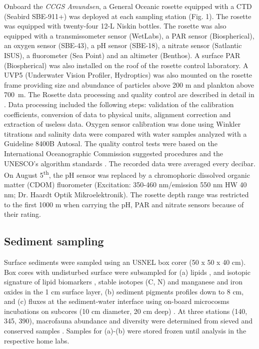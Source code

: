 \documentclass[essd, manuscript]{copernicus}
\begin{document}
Onboard the \textit{CCGS Amundsen}, a General Oceanic rosette equipped with a CTD (Seabird SBE-911+) was deployed at each sampling station (Fig. 1). The rosette was equipped with twenty-four 12-L Niskin bottles. The rosette was also equipped with a transmissometer sensor (WetLabs), a PAR sensor (Biospherical), an oxygen sensor (SBE-43), a pH sensor (SBE-18), a nitrate sensor (Satlantic ISUS), a fluorometer (Sea Point) and an altimeter (Benthos). A surface PAR (Biospherical) was also installed on the roof of the rosette control laboratory. A UVP5 (Underwater Vision Profiler, Hydroptics) was also mounted on the rosette frame providing size and abundance of particles above 200 \textmu{}m and plankton above 700~\textmu{}m. The Rosette data processing and quality control are described in detail in \citet{Guillot2010}. Data processing included the following steps: validation of the calibration coefficients, conversion of data to physical units, alignment correction and extraction of useless data. Oxygen sensor calibration was done using Winkler titrations and salinity data were compared with water samples analyzed with a Guideline 8400B Autosal. The quality control tests were based on the International Oceanographic Commission suggested procedures and the UNESCO’s algorithm standards \citep{UNESCO1993}. The recorded data were averaged every decibar. On August 5\textsuperscript{th}, the pH sensor was replaced by a chromophoric dissolved organic matter (CDOM) fluorometer (Excitation: 350-460 nm/emission 550 nm HW 40 nm; Dr. Haardt Optik Mikroelektronik). The rosette depth range was restricted to the first 1000 m when carrying the pH, PAR and nitrate sensors because of their rating.

\subsection{Sediment sampling}

Surface sediments were sampled using an USNEL box corer (50 x 50 x 40 cm). Box cores with undisturbed surface were subsampled for (a) lipids \citep{Rontani2012a}, and isotopic signature of lipid biomarkers \citep{Tolosa2013}, stable isotopes (C, N) and manganese and iron oxides \citep{Link2013a} in the 1 cm surface layer, (b) sediment pigments profiles down to 8 cm, and (c) fluxes at the sediment-water interface using on-board microcosms incubations on subcores (10 cm diameter, 20 cm deep) \citep{Link2013a, Link2019}. At three stations (140, 345, 390), macrofauna abundance and diversity were determined from sieved and conserved samples \citep{Link2019}. Samples for (a)-(b) were stored frozen until analysis in the respective home labs.
\end{document}
